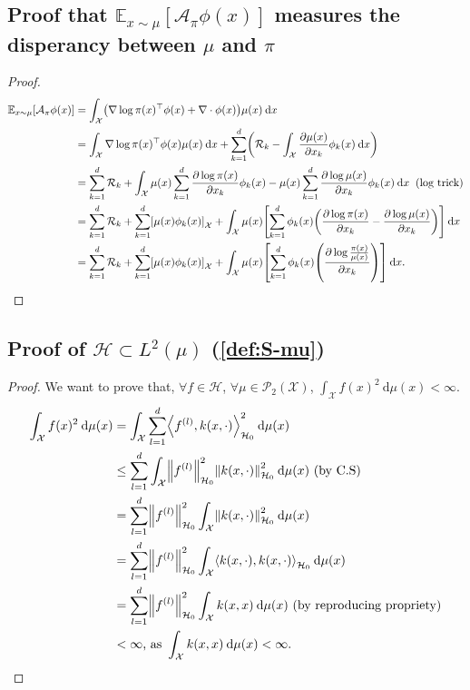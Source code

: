 \documentclass{article}
\newcommand{\E}{\mathbb{E}}
\newcommand{\X}{\mathcal{X}}
\newcommand{\A}{\mathcal{A}}
\renewcommand{\P}{\mathcal{P}}
\renewcommand{\H}{\mathcal{H}}
\newcommand{\diff}[2]{\frac{\partial #1}{\partial #2}}
\renewcommand{\d}{\: \mathrm{d}}
\DeclarePairedDelimiter{\norm}{\|}{\|}
\DeclarePairedDelimiter{\pare}{(}{)}
\DeclarePairedDelimiter{\sq}{[}{]}
\DeclarePairedDelimiter{\sca}{\langle}{\rangle}
\begin{document}
\subsection{Proof that $\E_{x \sim \mu}[\A_\pi \phi (x)]$ measures the disperancy between $\mu$ and $\pi$}
\begin{proof}\label{proof:Esp_distance}
    \begin{equation*}
  \begin{split}
    \E_{x \sim \mu}[\A_\pi \phi (x)] &=
      \int_\X \pare*{ \nabla \log \pi(x)^\top \phi(x) + \nabla \cdot \phi(x) } \mu(x) \d x \\
    &= \int_\X \nabla \log \pi(x)^\top \phi(x) \mu(x) \d x +
    \sum_{k=1}^d \pare*{ \mathcal{R}_k - \int_\X \diff{\mu(x)}{x_k} \phi_k(x) \d x} \\
    &= \sum_{k=1}^d \mathcal{R}_k +
      \int_\X  \mu(x) \sum_{k=1}^d \diff{\log \pi(x)}{x_k}\phi_k(x) -
    \mu(x) \sum_{k=1}^d \diff{\log \mu(x)}{x_k} \phi_k(x) \d x \;\; \text{(log trick)} \\
    &= \sum_{k=1}^d \mathcal{R}_k +
      \sum_{k=1}^d \sq*{\mu(x) \phi_k(x)}_\X + \int_\X  \mu(x) \sq*{ \sum_{k=1}^d \phi_k(x) \pare*{ \diff{\log \pi(x)}{x_k} - \diff{\log \mu(x)}{x_k}}} \d x \\
    &= \sum_{k=1}^d \mathcal{R}_k +
      \sum_{k=1}^d \sq*{\mu(x) \phi_k(x)}_\X + \int_\X  \mu(x) \sq*{ \sum_{k=1}^d \phi_k(x) \pare*{ \diff{\log \frac{\pi(x)}{\mu(x)}}{x_k}}} \d x.
  \end{split}
\end{equation*}
\end{proof}

\subsection{Proof of $\H \subset L^2(\mu)$ (\ref{def:S-mu})}\label{pro:H-L2}
\begin{proof}
  We want to prove that, $\forall f \in \H$, 
  $\forall \mu \in \P_2(\X)$, $\int_\X f(x)^2 \d \mu(x) < \infty$.
  \begin{align*}
    \int_\X f(x)^2 \d \mu(x) &= \int_\X \sum_{l=1}^d \sca*{ f^{(l)}, k(x, \cdot) }^2_{\H_0} \d \mu(x) \\
    &\leq \sum_{l=1}^d \int_\X \norm*{f^{(l)}}^2_{\H_0} \norm*{k(x, \cdot)}^2_{\H_0} \d \mu(x)
      \text{ (by C.S)} \\
    &= \sum_{l=1}^d \norm*{f^{(l)}}^2_{\H_0} \int_\X \norm*{k(x, \cdot)}^2_{\H_0} \d \mu(x) \\
    &= \sum_{l=1}^d \norm*{f^{(l)}}^2_{\H_0} \int_\X \sca*{k(x, \cdot), k(x, \cdot)}_{\H_0} \d \mu(x) \\
    &= \sum_{l=1}^d \norm*{f^{(l)}}^2_{\H_0} \int_\X k(x, x) \d \mu(x)
      \text{ (by reproducing propriety)} \\
    &< \infty \text{, as } \int_\X k(x, x) \d \mu(x) < \infty.
  \end{align*}
\end{proof}
\end{document}

